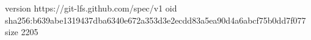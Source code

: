 version https://git-lfs.github.com/spec/v1
oid sha256:b639abe1319437dba6340e672a353d3e2ecdd83a5ea90d4a6abcf75b0dd7f077
size 2205

